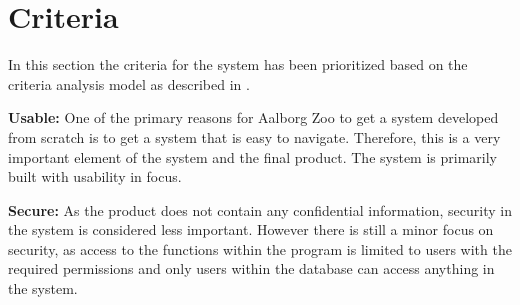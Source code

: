 \section{Criteria} \label{sc:criteria}
In this section the criteria for the system has been prioritized based on the criteria analysis model as described in \cite[chap 9]{OOAD}.

\begin{table}[H]
    \centering
    \caption{Checklist for prioritizing design criteria}
    \label{tab:my_label}
\end{table}

\textbf{Usable:} One of the primary reasons for Aalborg Zoo to get a system developed from scratch is to get a system that is easy to navigate. Therefore, this is a very important element of the system and the final product. The system is primarily built with usability in focus.

\textbf{Secure:} As the product does not contain any confidential information, security in the system is considered less important. However there is still a minor focus on security, as access to the functions within the program is limited to users with the required permissions and only users within the database can access anything in the system.

